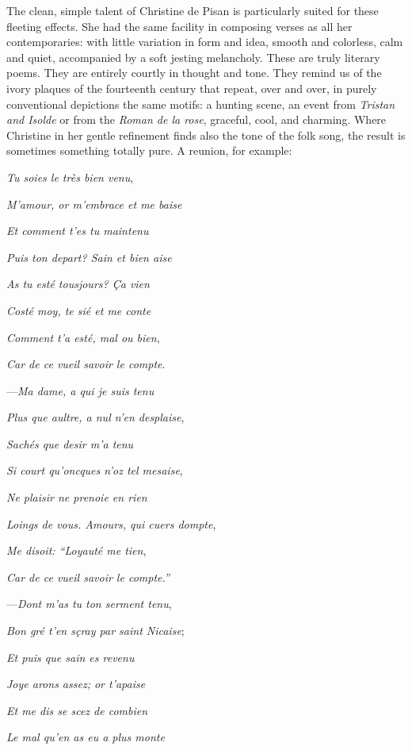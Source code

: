 \protect\hypertarget{21_Chapter_Thirteen__IMAGE_AND_WORD.xhtmlux5cux23page_358}{}{}The
clean, simple talent of Christine de Pisan is particularly suited for
these fleeting effects. She had the same facility in composing verses as
all her contemporaries: with little variation in form and idea, smooth
and colorless, calm and quiet, accompanied by a soft jesting melancholy.
These are truly literary poems. They are entirely courtly in thought and
tone. They remind us of the ivory plaques of the fourteenth century that
repeat, over and over, in purely conventional depictions the same
motifs: a hunting scene, an event from \emph{Tristan and Isolde} or from
the \emph{Roman de la rose}, graceful, cool, and charming. Where
Christine in her gentle refinement finds also the tone of the folk song,
the result is sometimes something totally pure. A reunion, for example:

\emph{Tu soies le très bien venu},

\emph{M'amour, or m'embrace et me baise}

\emph{Et comment t'es tu maintenu}

\emph{Puis ton depart? Sain et bien aise}

\emph{As tu esté tousjours? Ça vien}

\emph{Costé moy, te sié et me conte}

\emph{Comment t'a esté, mal ou bien},

\emph{Car de ce vueil savoir le compte}.

---\emph{Ma dame, a qui je suis tenu}

\emph{Plus que aultre, a nul n'en desplaise},

\emph{Sachés que desir m'a tenu}

\emph{Si court qu'oncques n'oz tel mesaise},

\emph{Ne plaisir ne prenoie en rien}

\emph{Loings de vous. Amours, qui cuers dompte},

\emph{Me disoit: ``Loyauté me tien},

\emph{Car de ce vueil savoir le compte.''}

---\emph{Dont m'as tu ton serment tenu},

\emph{Bon gré t'en sçray par saint Nicaise};

\emph{Et puis que sain es revenu}

\emph{Joye arons assez; or t'apaise}

\emph{Et me dis se scez de combien}

\emph{Le mal qu'en as eu a plus monte}

